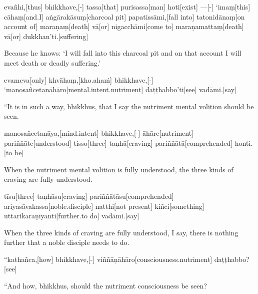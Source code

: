 \begin{samepage}
\begingl[glneveryline={\PaliGlossA,\PaliGlossB}]
evañhi,[thus] bhikkhave,[-] tassa[that] purisassa[man] hoti[exist] —[-] ‘imaṃ[this] cāhaṃ[and.I] aṅgārakāsuṃ[charcoal pit] papatissāmi,[fall into] tatonidānaṃ[on account of] maraṇaṃ[death] vā[or] nigacchāmi[come to] maraṇamattaṃ[death] vā[or] dukkhan’ti.[suffering]
\endgl
\nopagebreak
\linespread{0.5}
\begin{spacin}{0.2}
{\PaliGlossFT Because he knows: ‘I will fall into this charcoal pit and on that account I will meet death or deadly suffering.’}
\end{spacin}
\vskip 12pt
\end{samepage}
\begin{samepage}
\begingl[glneveryline={\PaliGlossA,\PaliGlossB}]
evameva[only] khvāhaṃ,[kho.ahaṁ] bhikkhave,[-] ‘manosañcetanāhāro[mental.intent.nutriment] daṭṭhabbo’ti[see] vadāmi.[say]
\endgl
\nopagebreak
\linespread{0.5}
\begin{spacin}{0.2}
{\PaliGlossFT “It is in such a way, bhikkhus, that I say the nutriment mental volition should be seen.}
\end{spacin}
\vskip 12pt
\end{samepage}
\begin{samepage}
\begingl[glneveryline={\PaliGlossA,\PaliGlossB}]
manosañcetanāya,[mind.intent] bhikkhave,[-] āhāre[nutriment] pariññāte[understood] tisso[three] taṇhā[craving] pariññātā[comprehended] honti.[to be]
\endgl
\nopagebreak
\linespread{0.5}
\begin{spacin}{0.2}
{\PaliGlossFT When the nutriment mental volition is fully understood, the three kinds of craving are fully understood.}
\end{spacin}
\vskip 12pt
\end{samepage}
\begin{samepage}
\begingl[glneveryline={\PaliGlossA,\PaliGlossB}]
tīsu[three] taṇhāsu[craving] pariññātāsu[comprehended] ariyasāvakassa[noble.disciple] natthi[not present] kiñci[something] uttarikaraṇīyanti[further.to do] vadāmi.[say]
\endgl
\nopagebreak
\linespread{0.5}
\begin{spacin}{0.2}
{\PaliGlossFT When the three kinds of craving are fully understood, I say, there is nothing further that a noble disciple needs to do.}
\end{spacin}
\vskip 12pt
\end{samepage}
\vskip 0.2in
\begin{samepage}
\begingl[glneveryline={\PaliGlossA,\PaliGlossB}]
“kathañca,[how] bhikkhave,[-] viññāṇāhāro[consciousness.nutriment] daṭṭhabbo?[see]
\endgl
\nopagebreak
\linespread{0.5}
\begin{spacin}{0.2}
{\PaliGlossFT “And how, bhikkhus, should the nutriment consciousness be seen?}
\end{spacin}
\vskip 12pt
\end{samepage}
